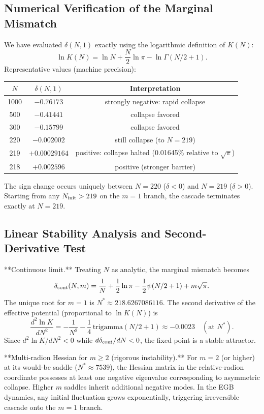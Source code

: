 \documentclass[12pt,a4paper]{article}
\begin{document}
\subsection{Numerical Verification of the Marginal Mismatch}

We have evaluated \(\delta(N,1)\) exactly using the logarithmic definition of \(K(N)\):
\[
\ln K(N) = \ln N + \frac{N}{2}\ln\pi - \ln\Gamma(N/2+1).
\]
Representative values (machine precision):

\begin{tabular}{c|c|c}
\(N\) & \(\delta(N,1)\) & Interpretation \\
\hline
1000 & \(-0.76173\) & strongly negative: rapid collapse \\
500  & \(-0.41441\) & collapse favored \\
300  & \(-0.15799\) & collapse favored \\
220  & \(-0.002002\) & still collapse (to \(N=219\)) \\
219  & \(+0.00029164\) & positive: collapse halted (0.01645\% relative to \(\sqrt{\pi}\)) \\
218  & \(+0.002596\) & positive (stronger barrier) \\
\end{tabular}

The sign change occurs uniquely between \(N=220\) (\(\delta<0\)) and \(N=219\) (\(\delta>0\)). Starting from any \(N_{\rm init}>219\) on the \(m=1\) branch, the cascade terminates exactly at \(N=219\).

\subsection{Linear Stability Analysis and Second-Derivative Test}

**Continuous limit.** Treating \(N\) as analytic, the marginal mismatch becomes
\[
\delta_{\rm cont}(N,m) = \frac{1}{N} + \frac12\ln\pi - \frac12\psi(N/2+1) + m\sqrt{\pi}.
\]
The unique root for \(m=1\) is \(N^*\approx218.6267086116\). The second derivative of the effective potential (proportional to \(\ln K(N)\)) is
\[
\frac{d^2\ln K}{dN^2} = -\frac{1}{N^2} - \frac14\,\mathrm{trigamma}(N/2+1) \approx -0.0023 \quad (\text{at }N^*).
\]
Since \(d^2\ln K/dN^2<0\) while \(d\delta_{\rm cont}/dN<0\), the fixed point is a stable attractor.

**Multi-radion Hessian for \(m\ge2\) (rigorous instability).** For \(m=2\) (or higher) at its would-be saddle (\(N^*\approx7539\)), the Hessian matrix in the relative-radion coordinate possesses at least one negative eigenvalue corresponding to asymmetric collapse. Higher \(m\) saddles inherit additional negative modes. In the EGB dynamics, any initial fluctuation grows exponentially, triggering irreversible cascade onto the \(m=1\) branch.
\end{document}
